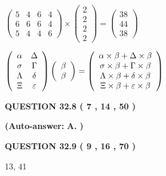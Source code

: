 \documentclass[12pt]{article}
\begin{document}
 
$\left( \begin{array}{ccccccccccccccc}
           5  & 
           4  & 
           6  & 
           4  \\ 
           6  & 
           6  & 
           6  & 
           4  \\ 
           5  & 
           4  & 
           4  & 
           6
\end{array}\right) \times
\left( \begin{array}{c}
           2  \\ 
           2  \\ 
           2  \\ 
           2
\end{array}\right)  =
\left( \begin{array}{c}
          38  \\ 
          44  \\ 
          38
\end{array}\right)  $
 
$  %
 \left( \begin{array}
 {
 c
 c
 }
 \alpha & 
 \Delta \\ 
 \sigma & 
 \Gamma \\ 
 \Lambda & 
 \delta \\ 
                    \Xi & 
 \varepsilon
 \end{array} \right)
 \left( \begin{array}
 {
 c
 }
 \beta \\ 
 \beta
 \end{array} \right)
=
 \left( \begin{array}
 {
 c
 }
  \alpha \times  \beta +  \Delta \times  \beta \\ 
  \sigma \times  \beta +  \Gamma \times  \beta \\ 
  \Lambda \times  \beta +  \delta \times  \beta \\ 
                     \Xi \times  \beta +  \varepsilon \times  \beta
 \end{array} \right)
$
 
  
  
{\textbf{\large{QUESTION
32.8 
 (           7 ,          14 ,          50 )
}}}
 
 
{\textbf{(Auto-answer:}}
{\textbf{\large{
A.}}}
{\textbf{)}}
 
 
  
  
{\textbf{\large{QUESTION
32.9 
 (           9 ,          16 ,          70 )
}}}

13,  %
41
 
\end{document}
